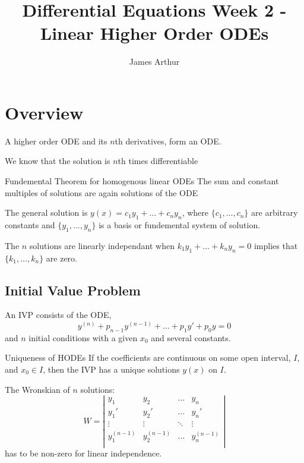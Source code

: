 \documentclass{article}
\title{Differential Equations Week 2 - Linear Higher Order ODEs}
\author{James Arthur}
\begin{document}
\maketitle
\tableofcontents\newpage


\section{Overview}
A higher order ODE and its $n$th derivatives, form an ODE.

We know that the solution is $n$th times differentiable\\

\noindent\begin{theorem}{Fundemental Theorem for homogenous linear ODEs}{}
   The sum and constant multiples of solutions are again solutions of the ODE
\end{theorem}\vspace{10pt}

The general solution is $\displaystyle{y(x) = c_1y_1 + \dots + c_ny_n}$, where $\{c_1,\dots, c_n \}$ are arbitrary constants and $\{y_1, \dots, y_n \}$ is a basis or fundemental system of solution.

The $n$ solutions are linearly independant when $k_1y_1+\dots+k_ny_n = 0$ implies that $\{k_1, \dots, k_n \}$ are zero.

\subsection{Initial Value Problem}
An IVP consists of the ODE, $$\displaystyle{y^{(n)} + p_{n-1}y^{(n-1)}+\dots +p_1y' + p_0y = 0}$$ and $n$ initial conditions with a given $x_0$ and several constants.\\

\noindent\begin{theorem}{Uniqueness of HODEs}{}
  If the coefficients are continuous on some open interval, $I$, and $x_0 \in I$, then the IVP has a unique solutions $y(x)$ on $I$.
\end{theorem}\vspace{10pt}

The Wronskian of $n$ solutions:
$$ W = \left|\begin{matrix}
  y_1 & y_2 & \dots & y_n \\
  y_1' & y_2' & \dots & y_n' \\
  \vdots & \vdots & \ddots & \vdots \\
  y_1^{(n-1)} & y_2^{(n-1)} & \dots & y_n^{(n-1)}\\
\end{matrix}\right| $$
has to be non-zero for linear independence.
\end{document}
